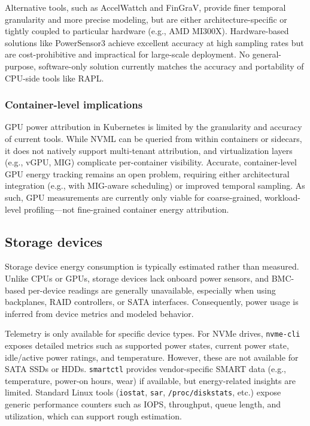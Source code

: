 Alternative tools, such as AccelWattch and FinGraV, provide finer temporal granularity and more precise modeling, but are either architecture-specific or tightly coupled to particular hardware (e.g., AMD MI300X). Hardware-based solutions like PowerSensor3 achieve excellent accuracy at high sampling rates but are cost-prohibitive and impractical for large-scale deployment. No general-purpose, software-only solution currently matches the accuracy and portability of CPU-side tools like RAPL.

\subsubsection{Container-level implications}
GPU power attribution in Kubernetes is limited by the granularity and accuracy of current tools. While NVML can be queried from within containers or sidecars, it does not natively support multi-tenant attribution, and virtualization layers (e.g., vGPU, MIG) complicate per-container visibility. Accurate, container-level GPU energy tracking remains an open problem, requiring either architectural integration (e.g., with MIG-aware scheduling) or improved temporal sampling. As such, GPU measurements are currently only viable for coarse-grained, workload-level profiling—not fine-grained container energy attribution.

\subsection{Storage devices}

Storage device energy consumption is typically estimated rather than measured. Unlike CPUs or GPUs, storage devices lack onboard power sensors, and BMC-based per-device readings are generally unavailable, especially when using backplanes, RAID controllers, or SATA interfaces. Consequently, power usage is inferred from device metrics and modeled behavior.

Telemetry is only available for specific device types. For NVMe drives, \texttt{nvme-cli} exposes detailed metrics such as supported power states, current power state, idle/active power ratings, and temperature. However, these are not available for SATA SSDs or HDDs. \texttt{smartctl} provides vendor-specific SMART data (e.g., temperature, power-on hours, wear) if available, but energy-related insights are limited. Standard Linux tools (\texttt{iostat}, \texttt{sar}, \texttt{/proc/diskstats}, etc.) expose generic performance counters such as IOPS, throughput, queue length, and utilization, which can support rough estimation.

